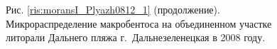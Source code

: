 \documentclass[12pt, a4paper]{disser}
\begin{document}
\begin{figure}[h]
	
%





%
%



	\begin{center}
	Рис. \ref{ris:moransI_Plyazh0812_1} (продолжение). Микрораспределение макробентоса на объединенном участке литорали Дальнего пляжа г.~Дальнезеленецкая в 2008 году.
	\end{center}
  \end{figure}
\end{document}
